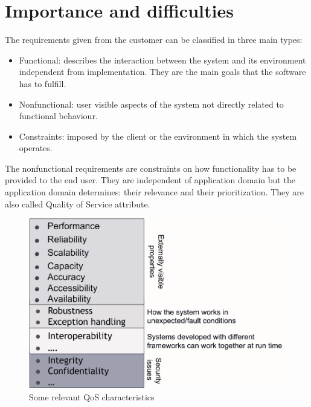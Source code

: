 \documentclass[12pt, a4paper]{report}
\newtheorem[style=M,bodystyle=\normalfont]{theorem}{Theorem}
\newtheorem[style=M,bodystyle=\normalfont]{corollary}{Corollary}
\newtheorem[style=M,bodystyle=\normalfont]{lemma}{Lemma}
\newtheorem[style=M,bodystyle=\normalfont]{definition}{Definition}
\begin{document}
    \section{Importance and difficulties}
    The requirements given from the customer can be classified in three main types:
    \begin{itemize}
        \item Functional: describes the interaction between the system and its environment independent from implementation. They are the main goals that the software has to fulfill.
        \item Nonfunctional: user visible aspects of the system not directly related to functional behaviour.
        \item Constraints: imposed by the client or the environment in which the system operates.
    \end{itemize}
    The nonfunctional requirements are constraints on how functionality has to be provided to the end user. They are independent of application domain but the application domain 
    determines: their relevance and their prioritization. They are also called Quality of Service attribute. 
    \begin{figure}[H]
        \centering
        \includegraphics[width=0.75\linewidth]{images/QoS.png}
        \caption{Some relevant QoS characteristics}
    \end{figure}
\end{document}
